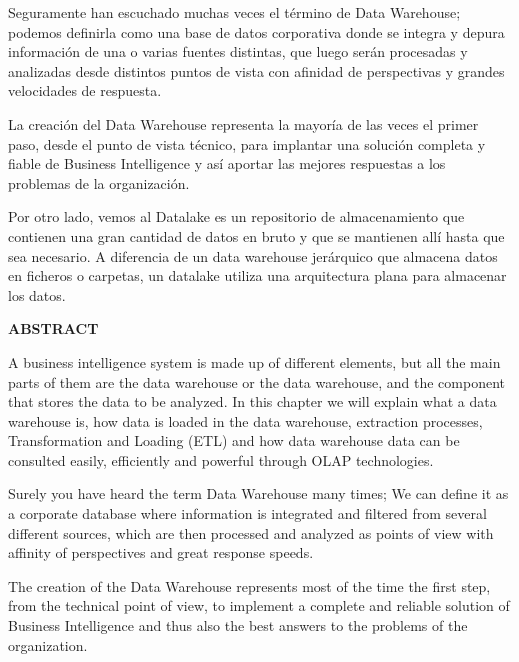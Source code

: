 \documentclass{article} %
\begin{document}
\noindent 

\noindent Seguramente han escuchado muchas veces el t\'{e}rmino de Data Warehouse; podemos definirla como una base de datos corporativa donde se integra y depura informaci\'{o}n de una o varias fuentes distintas, que luego ser\'{a}n procesadas y analizadas desde distintos puntos de vista con afinidad de perspectivas y grandes velocidades de respuesta.

\noindent 

\noindent La creaci\'{o}n del Data Warehouse representa la mayor\'{i}a de las veces el primer paso, desde el punto de vista t\'{e}cnico, para implantar una soluci\'{o}n completa y fiable de Business Intelligence y as\'{i} aportar las mejores respuestas a los problemas de la organizaci\'{o}n.

\noindent 

\noindent Por otro lado, vemos al Datalake es un repositorio de almacenamiento que contienen una gran cantidad de datos en bruto y que se mantienen all\'{i} hasta que sea necesario. A diferencia de un data warehouse jer\'{a}rquico que almacena datos en ficheros o carpetas, un datalake utiliza una arquitectura plana para almacenar los datos.

\noindent \textbf{ABSTRACT}

\noindent \textbf{}

\noindent A business intelligence system is made up of different elements, but all the main parts of them are the data warehouse or the data warehouse, and the component that stores the data to be analyzed. In this chapter we will explain what a data warehouse is, how data is loaded in the data warehouse, extraction processes, Transformation and Loading (ETL) and how data warehouse data can be consulted easily, efficiently and powerful through OLAP technologies.

\noindent 

\noindent Surely you have heard the term Data Warehouse many times; We can define it as a corporate database where information is integrated and filtered from several different sources, which are then processed and analyzed as points of view with affinity of perspectives and great response speeds.

\noindent 

\noindent The creation of the Data Warehouse represents most of the time the first step, from the technical point of view, to implement a complete and reliable solution of Business Intelligence and thus also the best answers to the problems of the organization.
\end{document}
